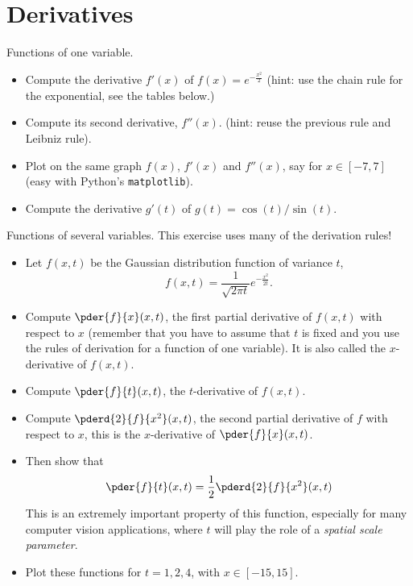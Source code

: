 \documentclass[a4paper,10pt]{article}
\begin{document}
\section{Derivatives}
Functions of one variable.
\begin{itemize}
  \item Compute the derivative $f'(x)$ of $f(x) = e^{-\frac{x^2}{2}}$ (hint: use the chain rule for the exponential, see the tables below.)
  \item Compute its second derivative, $f''(x)$. (hint: reuse the previous rule and Leibniz rule).
  \item Plot on the same graph $f(x)$, $f'(x)$ and $f''(x)$, say for $x\in[-7,7]$ (easy with Python's \texttt{matplotlib}).
  \item Compute the derivative $g'(t)$ of $g(t) = \cos(t)/\sin(t)$.
\end{itemize}
Functions of several variables. This exercise uses many of the derivation rules!
\begin{itemize}
  \item Let $f(x,t)$ be the Gaussian distribution function of variance $t$,
  $$
  f(x,t) = \frac1{\sqrt{2\pi t}}e^{-\frac{x^2}{2t}}.
  $$
  \item Compute $\pder{f}{x}(x,t)$, the first partial derivative of $f(x,t)$ with respect to $x$ (remember that you have to assume that $t$ is fixed and you use the rules of derivation for a function of one variable).
  It is also called the $x$-derivative of $f(x,t)$.
  \item Compute $\pder{f}{t}(x,t)$, the $t$-derivative of $f(x,t)$.
  \item Compute $\pderd{2}{f}{x^2}(x,t)$, the second partial derivative of $f$ with respect to $x$, this is the $x$-derivative of $\pder{f}{x}(x,t)$.
  \item Then show that 
  $$
  \pder{f}{t}(x,t) = \frac12\pderd{2}{f}{x^2}(x,t)
  $$
  This is an extremely important property of this function, especially for many computer vision applications, where $t$ will play the role of a \emph{spatial scale parameter}.
  \item Plot these functions for $t=1,2,4$, with $x\in [-15,15]$.
\end{itemize}
\end{document}
